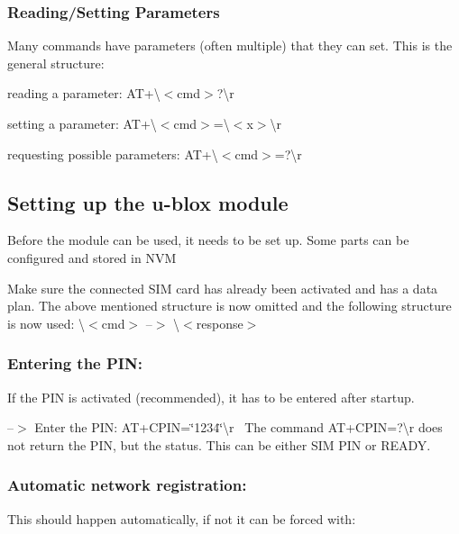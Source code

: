 \subsubsection*{Reading/\+Setting Parameters}

Many commands have parameters (often multiple) that they can set. This is the general structure\+:
\begin{DoxyItemize}
\item reading a parameter\+: {\ttfamily A\+T+\textbackslash{}$<$cmd$>$?\textbackslash{}r}
\item setting a parameter\+: {\ttfamily A\+T+\textbackslash{}$<$cmd$>$=\textbackslash{}$<$x$>$\textbackslash{}r}
\item requesting possible parameters\+: {\ttfamily A\+T+\textbackslash{}$<$cmd$>$=?\textbackslash{}r}
\end{DoxyItemize}

\subsection*{Setting up the u-\/blox module}

Before the module can be used, it needs to be set up. Some parts can be configured and stored in N\+VM

Make sure the connected S\+IM card has already been activated and has a data plan. The above mentioned structure is now omitted and the following structure is now used\+: {\ttfamily \textbackslash{}$<$cmd$>$} --$>$ {\ttfamily \textbackslash{}$<$response$>$}

\subsubsection*{Entering the P\+IN\+:}

If the P\+IN is activated (recommended), it has to be entered after startup.

--$>$ Enter the P\+IN\+: {\ttfamily A\+T+\+C\+P\+IN=\char`\"{}1234\char`\"{}\textbackslash{}r}~\newline
 The command {\ttfamily A\+T+\+C\+P\+IN=?\textbackslash{}r} does not return the P\+IN, but the status. This can be either {\ttfamily S\+IM P\+IN} or {\ttfamily R\+E\+A\+DY}.

\subsubsection*{Automatic network registration\+:}

This should happen automatically, if not it can be forced with\+:

